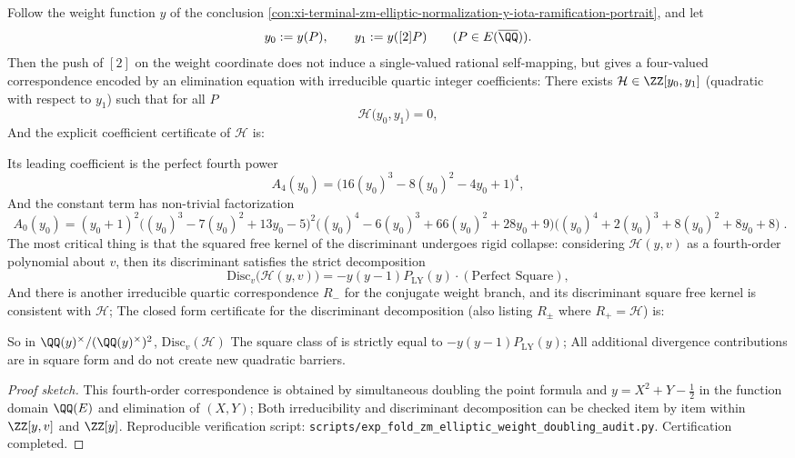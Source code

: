 \begin{conclusion}\label{con:xi-terminal-zm-elliptic-weight-doubling-quartic-elimination-disc}
Follow the weight function \(y\) of the conclusion \ref{con:xi-terminal-zm-elliptic-normalization-y-iota-ramification-portrait}, and let
\[
y_0:=y(P),\qquad y_1:=y([2]P)\qquad(P\in E(\overline{\QQ})).
\]
Then the push of \([2]\) on the weight coordinate does not induce a single-valued rational self-mapping, but gives a four-valued correspondence encoded by an elimination equation with irreducible quartic integer coefficients:
There exists \(\mathcal H\in\ZZ[y_0,y_1]\) (quadratic with respect to \(y_1\)) such that for all \(P\)
\[
\mathcal H\bigl(y_0,y_1\bigr)=0,
\]
And the explicit coefficient certificate of \(\mathcal H\) is:

Its leading coefficient is the perfect fourth power
\[
A_{4}(y_0)=\bigl(16(y_0)^{3}-8(y_0)^{2}-4y_0+1\bigr)^{4},
\]
And the constant term has non-trivial factorization
\[
\boxed{\;
A_{0}(y_0)
=(y_0+1)^{2}\bigl((y_0)^{3}-7(y_0)^{2}+13y_0-5\bigr)^{2}
\bigl((y_0)^{4}-6(y_0)^{3}+66(y_0)^{2}+28y_0+9\bigr)
\bigl((y_0)^{4}+2(y_0)^{3}+8(y_0)^{2}+8y_0+8\bigr)\; }.
\]
The most critical thing is that the squared free kernel of the discriminant undergoes rigid collapse: considering \(\mathcal H(y,v)\) as a fourth-order polynomial about \(v\), then its discriminant satisfies the strict decomposition
\[
\mathrm{Disc}_{v}\bigl(\mathcal H(y,v)\bigr)=-y(y-1)P_{\mathrm{LY}}(y)\cdot(\text{Perfect Square}),
\]
And there is another irreducible quartic correspondence \(R_{-}\) for the conjugate weight branch, and its discriminant square free kernel is consistent with \(\mathcal H\);
The closed form certificate for the discriminant decomposition (also listing \(R_{\pm}\) where \(R_{+}=\mathcal H\)) is:

So in \(\QQ(y)^{\times}/(\QQ(y)^{\times})^{2}\),
\(
\mathrm{Disc}_{v}(\mathcal H)
\)
The square class of is strictly equal to \(-y(y-1)P_{\mathrm{LY}}(y)\);
All additional divergence contributions are in square form and do not create new quadratic barriers.
\end{conclusion}
\begin{proof}[Proof sketch]
This fourth-order correspondence is obtained by simultaneous doubling the point formula and \(y=X^{2}+Y-\tfrac12\) in the function domain \(\QQ(E)\) and elimination of \((X,Y)\);
Both irreducibility and discriminant decomposition can be checked item by item within \(\ZZ[y,v]\) and \(\ZZ[y]\).
Reproducible verification script: \texttt{scripts/exp\_fold\_zm\_elliptic\_weight\_doubling\_audit.py}. Certification completed.
\end{proof}

